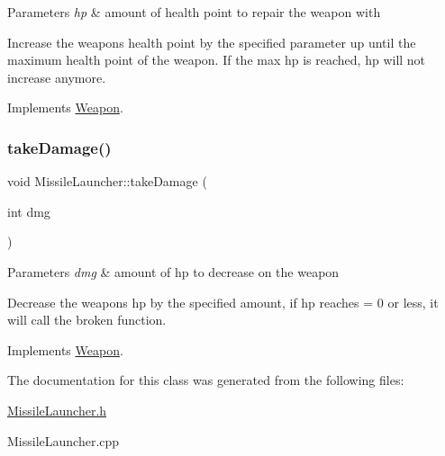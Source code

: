 \begin{DoxyParams}{Parameters}
{\em hp} & amount of health point to repair the weapon with\\
\hline
\end{DoxyParams}
Increase the weapons health point by the specified parameter up until the maximum health point of the weapon. If the max hp is reached, hp will not increase anymore. 

Implements \hyperlink{classWeapon}{Weapon}.

\mbox{\label{classMissileLauncher_adc8ac71046e1a09962799897187e7759}} 
\subsubsection{\texorpdfstring{take\+Damage()}{takeDamage()}}
{\footnotesize\ttfamily void Missile\+Launcher\+::take\+Damage (\begin{DoxyParamCaption}\item[{int}]{dmg }\end{DoxyParamCaption})\hspace{0.3cm}{\ttfamily [virtual]}}


\begin{DoxyParams}{Parameters}
{\em dmg} & amount of hp to decrease on the weapon\\
\hline
\end{DoxyParams}
Decrease the weapons hp by the specified amount, if hp reaches = 0 or less, it will call the broken function. 

Implements \hyperlink{classWeapon}{Weapon}.



The documentation for this class was generated from the following files\+:\begin{DoxyCompactItemize}
\item 
\hyperlink{MissileLauncher_8h}{Missile\+Launcher.\+h}\item 
Missile\+Launcher.\+cpp\end{DoxyCompactItemize}
